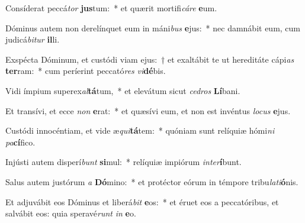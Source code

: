 \item Consíderat peccá\textit{tor} \textbf{jus}tum:~* et quærit mortifi\textit{cá}\textit{re} \textbf{e}um.
\item Dóminus autem non derelínquet eum in máni\textit{bus} \textbf{e}jus:~* nec damnábit eum, cum judicá\textit{bi}\textit{tur} \textbf{il}li.
\item Exspécta Dóminum, et custódi viam ejus:~† et exaltábit te ut hereditáte cápi\textit{as} \textbf{ter}ram:~* cum períerint peccató\textit{res} \textit{vi}\textbf{dé}bis.
\item Vidi ímpium superex\textit{al}\textbf{tá}tum,~* et elevátum sicut \textit{ce}\textit{dros} \textbf{Lí}bani.
\item Et transívi, et ecce \textit{non} \textbf{e}rat:~* et quæsívi eum, et non est invéntus \textit{lo}\textit{cus} \textbf{e}jus.
\item Custódi innocéntiam, et vide æ\textit{qui}\textbf{tá}tem:~* quóniam sunt relíquiæ hómi\textit{ni} \textit{pa}\textbf{cí}fico.
\item Injústi autem disperí\textit{bunt} \textbf{si}mul:~* relíquiæ impiórum \textit{in}\textit{ter}\textbf{í}bunt.
\item Salus autem justórum \textit{a} \textbf{Dó}mino:~* et protéctor eórum in témpore tribu\textit{la}\textit{ti}\textbf{ó}nis.
\item Et adjuvábit eos Dóminus et liberá\textit{bit} \textbf{e}os:~* et éruet eos a peccatóribus, et salvábit eos: quia speravé\textit{runt} \textit{in} \textbf{e}o.
